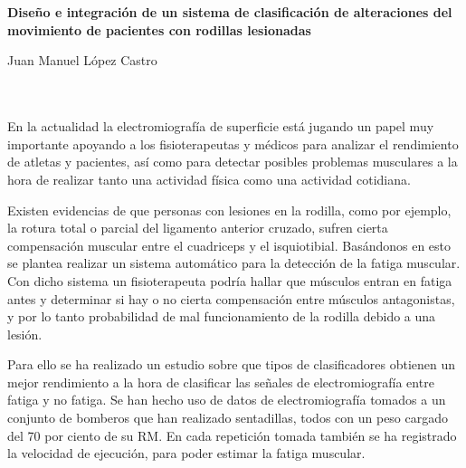 \chapter*{}


%



\cleardoublepage
\thispagestyle{empty}

\begin{center}
{\large\bfseries  Diseño e integración de un sistema de clasificación de alteraciones del movimiento de pacientes con rodillas lesionadas}\\
\end{center}
\begin{center}
Juan Manuel López Castro\\
\end{center}

\\

\vspace{0.7cm}
\\

En la actualidad la electromiografía de superficie está jugando un papel muy importante apoyando a los fisioterapeutas y médicos para analizar el rendimiento de atletas y pacientes, así como para detectar posibles problemas musculares a la hora de realizar tanto una actividad física como una actividad cotidiana. 

Existen evidencias de que personas con lesiones en la rodilla, como por ejemplo, la rotura total o parcial del ligamento anterior cruzado, sufren cierta compensación muscular entre el cuadriceps y el isquiotibial. Basándonos en esto se plantea realizar un sistema automático para la detección de la fatiga muscular. Con dicho sistema un fisioterapeuta podría hallar que músculos entran en fatiga antes y determinar si hay o no cierta compensación entre músculos antagonistas, y por lo tanto probabilidad de mal funcionamiento de la rodilla debido a una lesión. 

Para ello se ha realizado un estudio sobre que tipos de clasificadores obtienen un mejor rendimiento a la hora de clasificar las señales de electromiografía entre fatiga y no fatiga. Se han hecho uso de datos de electromiografía tomados a un conjunto de bomberos que han realizado sentadillas, todos con un peso cargado del 70 por ciento de su RM. En cada repetición tomada también se ha registrado la velocidad de ejecución, para poder estimar la fatiga muscular.


